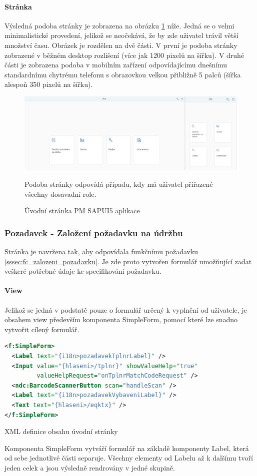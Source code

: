 \documentclass[thesis=M,czech]{FITthesis}[2012/06/26]
\begin{document}
\paragraph{Stránka} Výsledná podoba stránky je zobrazena na obrázku \ref{img:view_pm} níže. Jedná se o velmi minimalistické provedení, jelikož se neočekává, že by zde uživatel trávil větší množství času. Obrázek je rozdělen na dvě části. V první je podoba stránky zobrazené v běžném desktop rozlišení (více jak 1200 pixelů na šířku). V druhé části je zobrazena podoba v mobilním zařízení odpovídajícímu dnešnímu standardnímu chytrému telefonu s obrazovkou velkou přibližně 5 palců (šířka alespoň 350 pixelů na šířku).
\begin{figure}[H]
	\centering
	\includegraphics[width=1\textwidth]{images/view_pm}
	\caption{Úvodní stránka PM SAPUI5 aplikace}
	\label{img:view_pm}
	\small Podoba stránky odpovídá případu, kdy má uživatel přiřazené všechny dosavadní role.
\end{figure}

\subsubsection{Pozadavek - Založení požadavku na údržbu}
\label{sssec:pozadavek}
Stránka je navržena tak, aby odpovídala funkčnímu požadavku \ref{sssec:fc_zalozeni_pozadavku}. Je zde proto vytvořen formulář umožňující zadat veškeré potřebné údaje ke specifikování požadavku. 
\paragraph{View}
Jelikož se jedná v podstatě pouze o formulář určený k vyplnění od uživatele, je obsahem view především komponenta SimpleForm, pomocí které lze snadno vytvořit cílený formulář. 
\begin{algorithm}[H]
	\begin{lstlisting}[language=xml]      
<f:SimpleForm>
  <Label text="{i18n>pozadavekTplnrLabel}" />
  <Input value="{hlaseni>/tplnr}" showValueHelp="true" 
         valueHelpRequest="onTplnrMatchCodeRequest" />
  <ndc:BarcodeScannerButton scan="handleScan" />
  <Label text="{i18n>pozadavekVybaveniLabel}" />
  <Text text="{hlaseni>/eqktx}" />
</f:SimpleForm>
	\end{lstlisting}
	\caption{XML definice obsahu úvodní stránky}	
	\label{code:view_pozadavek_form}
	\small Komponenta SimpleForm vytváří formulář na základě komponenty Label, která od sebe jednotlivé části separuje. Všechny elementy od Labelu až k dalšímu tvoří jeden celek a jsou výsledně rendrovány v jedné skupině.
\end{algorithm}	
\end{document}
